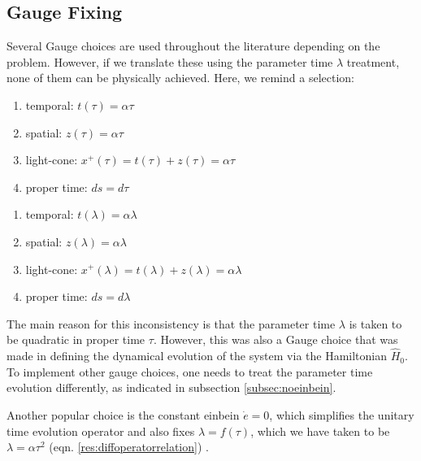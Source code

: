 \documentclass[twoside,a4paper,11pt]{article}
\numberwithin{equation}{section}
\begin{document}
\subsection{Gauge Fixing}
\label{sec:gaugefixing}
Several Gauge choices are used throughout the literature depending on the problem. However, if we translate these using the parameter time $\lambda$ treatment, none of them can be physically achieved. Here, we remind a selection:
\begin{multicols}{2}
\begin{enumerate}
    \item temporal: $t(\tau) = \alpha \tau$
    
    \item spatial: $z(\tau) = \alpha \tau$
    
    \item light-cone: $x^+(\tau) = t(\tau) + z(\tau) = \alpha \tau$
    
    \item proper time: $ds = d\tau$

\end{enumerate}

\begin{enumerate}
    \item temporal: $t(\lambda) = \alpha \lambda$
    
    \item spatial: $z(\lambda) = \alpha \lambda$
    
    \item light-cone: $x^+(\lambda) = t(\lambda) + z(\lambda) = \alpha \lambda$
    
    \item proper time: $ds = d\lambda$

\end{enumerate}
\end{multicols}
The main reason for this inconsistency is that the parameter time $\lambda$ is taken to be quadratic in proper time $\tau$. However, this was also a Gauge choice that was made in defining the dynamical evolution of the system via the Hamiltonian $\hat{H}_0$. To implement other gauge choices, one needs to treat the parameter time evolution differently, as indicated in subsection \ref{subsec:noeinbein}.

Another popular choice is the constant einbein $\dot{e} = 0$, which simplifies the unitary time evolution operator  and also fixes $\lambda = f(\tau)$, which we have taken to be $\lambda = \alpha \tau^2$ (eqn. \ref{res:diffoperatorrelation}) .
\end{document}
